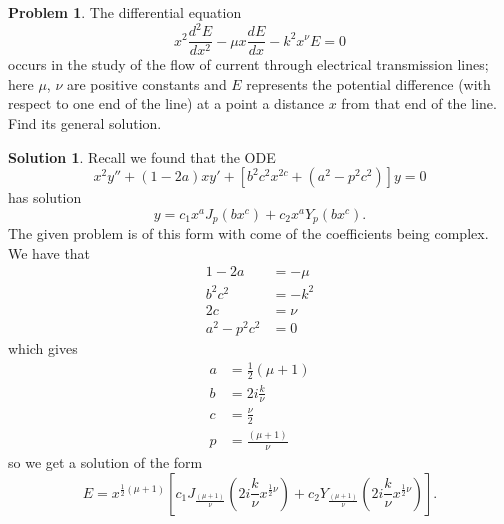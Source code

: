 \documentclass[10pt]{article}
\theoremstyle{definition}
\newtheorem{problem}{Problem}
\newtheorem{soln}{Solution}
\begin{document}
\begin{problem}
The differential equation
$$x^2\frac{d^2E}{dx^2}-\mu x\frac{dE}{dx}-k^2x^\nu E=0$$
occurs in the study of the flow of current through electrical transmission lines; here $\mu$, $\nu$ are positive
constants and $E$ represents the potential difference (with respect to one end of the line) at a point a
distance $x$ from that end of the line. Find its general solution.
\end{problem}
\begin{soln}
  Recall we found that the ODE
  $$x^2y''+(1-2a)xy'+\left[b^2c^2x^{2c}+(a^2-p^2c^2)\right]y=0$$
  has solution
  $$y=c_1x^aJ_p(bx^c)+c_2x^aY_p(bx^c).$$
  The given problem is of this form with come of the coefficients being complex. We have that
  \begin{align*}
    1-2a       & =-\mu \\
    b^2c^2     & =-k^2 \\
    2c         & =\nu  \\
    a^2-p^2c^2 & =0
  \end{align*}
  which gives
  \begin{align*}
    a & =\frac{1}{2}(\mu+1)  \\
    b & =2i\frac{k}{\nu}     \\
    c & =\frac{\nu}{2}       \\
    p & =\frac{(\mu+1)}{\nu}
  \end{align*}
  so we get a solution of the form
  $$E=x^{\frac{1}{2}(\mu+1)}\left[c_1J_{\frac{(\mu+1)}{\nu}}(2i\frac{k}{\nu} x^{\frac{1}{2}\nu})+c_2Y_{\frac{(\mu+1)}{\nu}}(2i\frac{k}{\nu} x^{\frac{1}{2}\nu})\right].$$
\end{soln}
\end{document}
